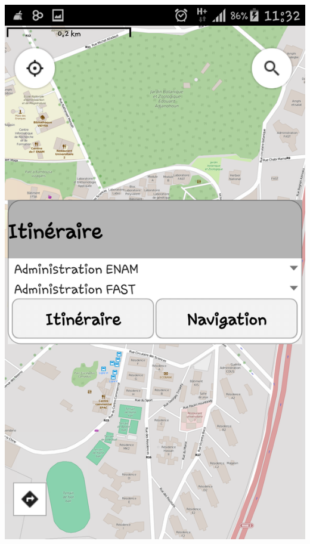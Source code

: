 \documentclass[11pt,handout]{beamer}
\begin{document}
		       \begin{frame}
			  \hspace{1.5cm}
			  \includegraphics[scale=0.1]{images/Itin_cher.png}
			  \hspace{0.5cm}

\end{frame}
\end{document}
